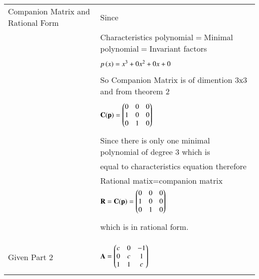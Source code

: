 \documentclass[journal,12pt]{IEEEtran}
\begin{document}
\begin{longtable}{|l|l|}
\hline
\multirow{3}{*}{Companion Matrix and Rational Form} & \\
&Since\\
&\\
&Characteristics polynomial$=$Minimal polynomial$=$Invariant factors\\
&\\
&$p\left(x\right)=x^3+0x^2+0x+0$\\
&\\
&So Companion Matrix is of dimention 3x3 and from theorem 2\\
&\\
&$\mathbf{C(p)}=\begin{pmatrix}0&0&0\\1&0&0\\0&1&0\end{pmatrix}$\\
&\\
&Since there is only one minimal polynomial of degree 3 
which is\\ &equal to characteristics equation therefore\\ &Rational matix=companion matrix\\ 
&$\mathbf{R}=\mathbf{C(p)}=\begin{pmatrix}0&0&0\\1&0&0\\0&1&0\end{pmatrix}$\\
&\\
&which is in rational form.\\
&\\
\hline \hline
&\\




\multirow{3}{*}{Given Part 2} & \\
&$\mathbf{A}=\begin{pmatrix}c&0&-1\\0&c&1\\1&1&c\end{pmatrix}$\\
&\\
\hline



\end{longtable}
\end{document}
